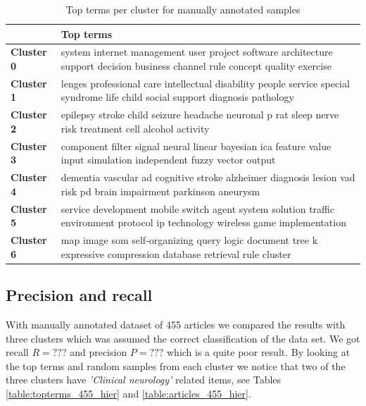 \begin{table}
\begin{tabular}{|p{2cm}|p{10.5cm}|} 
\hline %
\textbf{ } & \textbf{Top terms} \\ 
\hline 
\textbf{Cluster 0} & system internet management user project software architecture support decision business channel rule concept quality exercise  \\ 
\hline
\hline 
\textbf{Cluster 1} & lenges professional care intellectual disability people service special syndrome life child social support diagnosis pathology  \\ 
\hline
\hline 
\textbf{Cluster 2} & epilepsy stroke child seizure headache neuronal p rat sleep nerve risk treatment cell alcohol activity  \\ 
\hline
\hline 
\textbf{Cluster 3} & component filter signal neural linear bayesian ica feature value input simulation independent fuzzy vector output \\ 
\hline
\hline 
\textbf{Cluster 4} & dementia vascular ad cognitive stroke alzheimer diagnosis lesion vad risk pd brain impairment parkinson aneurysm \\ 
\hline
\hline 
\textbf{Cluster 5} & service development mobile switch agent system solution traffic environment protocol ip technology wireless game implementation \\ 
\hline
\hline 
\textbf{Cluster 6} & map image som self-organizing query logic document tree k expressive compression database retrieval rule cluster \\ 
\hline
\end{tabular} %
\caption{Top terms per cluster for manually annotated samples}
\label{table:topterms}
\end{table} %


\subsection{Precision and recall}
With manually annotated dataset of 455 articles we compared 
the results with three clusters which was assumed the correct 
classification of the data set. We got recall $R = ???$ and 
precision $P = ???$ which is
a quite poor result. By looking at the top terms and random samples
from each cluster we notice that two of the three clusters have 
\emph{'Clinical neurology'} related items, see Tables
\ref{table:topterms_455_hier} and \ref{table:articles_455_hier}.

